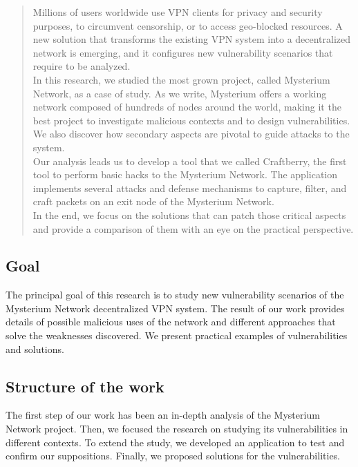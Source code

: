 \documentclass[12pt]{article}
\begin{document}
	\begin{abstract}
	\begin{flushleft}
		Millions of users worldwide use VPN clients for privacy and security purposes, to circumvent censorship, or to access geo-blocked resources. A new solution that transforms the existing VPN system into a decentralized network is emerging, and it configures new vulnerability scenarios that require to be analyzed.\\ 
    	In this research, we studied the most grown project, called Mysterium Network, as a case of study. As we write, Mysterium offers a working network composed of hundreds of nodes around the world, making it the best project to investigate malicious contexts and to design vulnerabilities. We also discover how secondary aspects are pivotal to guide attacks to the system.\\
		Our analysis leads us to develop a tool that we called Craftberry, the first tool to perform basic hacks to the Mysterium Network. The application implements several attacks and defense mechanisms to capture, filter, and craft packets on an exit node of the Mysterium Network.\\
		In the end, we focus on the solutions that can patch those critical aspects and provide a comparison of them with an eye on the practical perspective.
	\end{flushleft}
	\end{abstract}
		
	\pagebreak

	\subsection{Goal}
	The principal goal of this research is to study new vulnerability scenarios of the  Mysterium Network decentralized VPN system. The result of our work provides details of possible malicious uses of the network and different approaches that solve the weaknesses discovered. We present practical examples of vulnerabilities and solutions.

	\subsection{Structure of the work}
	The first step of our work has been an in-depth analysis of the Mysterium Network project. Then, we focused the research on studying its vulnerabilities in different contexts. To extend the study, we developed an application to test and confirm our suppositions. Finally, we proposed solutions for the vulnerabilities. 
\end{document}

